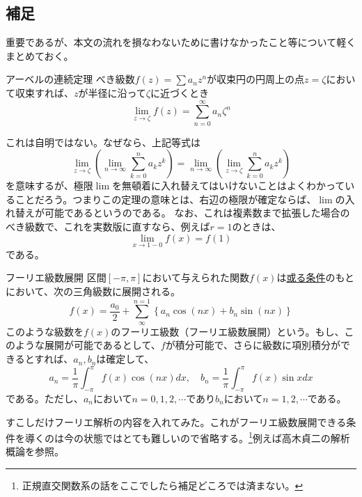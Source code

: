 \documentclass[a4j,dvipdfmx]{jsarticle}
\begin{document}
            \subsection{補足}
                重要であるが、本文の流れを損なわないために書けなかったこと等について軽くまとめておく。
                \begin{itembox}{アーベルの連続定理}
                    べき級数$f(z)=\sum a_nz^n$が収束円の円周上の点$z=\zeta$において収束すれば、$z$が半径に沿って$\zeta$に近づくとき
                    \begin{equation}
                        \lim_{z\to\zeta}f(z)=\sum_{n=0}^{\infty}a_n\zeta^n
                    \end{equation}
                \end{itembox}
                これは自明ではない。なぜなら、上記等式は
                \begin{equation*}
                    \lim_{z\to\zeta}\left(\lim_{n\to\infty}\sum_{k=0}^{n}a_kz^{k}\right)=\lim_{n\to\infty}\left(\lim_{z\to\zeta}\sum_{k=0}^{n}a_kz^{k}\right)
                \end{equation*}
                を意味するが、極限$\lim$を無頓着に入れ替えてはいけないことはよくわかっていることだろう。つまりこの定理の意味とは、右辺の極限が確定ならば、$\lim$の入れ替えが可能であるというのである。
                なお、これは複素数まで拡張した場合のべき級数で、これを実数版に直すなら、例えば$r=1$のときは、
                \begin{equation*}
                    \lim_{x\to 1-0}f(x)=f(1)
                \end{equation*}
                である。\\

                \begin{itembox}{フーリエ級数展開}
                    区間$[-\pi,\pi]$において与えられた関数$f(x)$は\underline{或る条件}のもとにおいて、次の三角級数に展開される。
                    \begin{equation}
                        f(x)=\frac{a_0}{2}+\sum_{\infty}^{n=1}\left\{a_n\cos(nx)+b_n\sin(nx)\right\}
                    \end{equation}
                    このような級数を$f(x)$のフーリエ級数（フーリエ級数展開）という。もし、このような展開が可能であるとして、$f$が積分可能で、さらに級数に項別積分ができるとすれば、$a_n,b_n$は確定して、
                    \begin{equation*}
                        a_n=\frac{1}{\pi}\int_{-\pi}^{\pi}f(x)\cos(nx)dx,\quad b_n=\frac{1}{\pi}\int_{-\pi}^{\pi}f(x)\sin xdx
                    \end{equation*}
                    である。ただし、$a_n$において$n=0,1,2,\cdots$であり$b_n$において$n=1,2,\cdots$である。
                \end{itembox}
                すこしだけフーリエ解析の内容を入れてみた。これがフーリエ級数展開できる条件を導くのは今の状態ではとても難しいので省略する。\footnote{正規直交関数系の話をここでしたら補足どころでは済まない。}例えば高木貞二の解析概論を参照。
\end{document}
